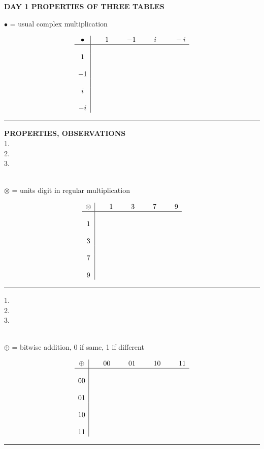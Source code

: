 \documentclass[12pt, fleqn, oneside]{book}
\begin{document}
{\large \bf DAY 1  PROPERTIES OF THREE TABLES}\\[.25in]
%
%
%
$\bullet $ = usual complex multiplication\\
\begin{minipage}{2.75in}
$$\begin{array}{c|cccc}
\bullet & \phantom{--}1\phantom{--} & -1& \phantom{--}i &\phantom{--} -i\\
\hline
\\
1&&&&\\
\\
-1&&&&\\
\\
i&&&&\\
\\
-i&&&&
\end{array}$$
\end{minipage}\rule{.75in}{0in}
\begin{minipage}{3in}
{\bf PROPERTIES, OBSERVATIONS}\\
1.\\[.3in]
2.\\[.3in]
3.\\
\end{minipage}\\[.75in]
%
%
%
$\otimes $ = units digit in regular multiplication\\
\begin{minipage}{2.6in}
$$\begin{array}{c|cccc}
\otimes & \phantom{--}1\phantom{--} & 3 & \phantom{--}7 &\phantom{--} 9\\
\hline
\\
1&&&&\\
\\
3&&&&\\
\\
7&&&&\\
\\
9&&&&
\end{array}$$
\end{minipage}\rule{.85in}{0in}
\begin{minipage}{3in}
1.\\[.3in]
2.\\[.3in]
3.\\
\end{minipage}\\[.75in]
%
%
%
$\oplus $ = bitwise addition, 0 if same, 1 if different\\
\begin{minipage}{2.75in}
$$\begin{array}{c|cccc}
\oplus & \phantom{--}00\phantom{--} & 01 & \phantom{--}10 &\phantom{--} 11\\
\hline
\\
00&&&&\\
\\
01&&&&\\
\\
10&&&&\\
\\
11&&&&
\end{array}$$
\end{minipage}\rule{.75in}{0in}
\end{document}
